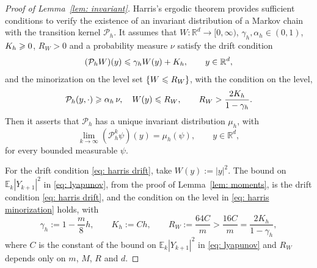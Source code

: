 \begin{proof}[Proof of Lemma~\ref{lem: invariant}]
    Harris's ergodic theorem \citep[Theorem~1.2]{hairer2008yet} provides sufficient conditions to verify the existence of an invariant distribution of a Markov chain with the transition kernel $\mathcal P_h$. It assumes that $W \colon \mathbb R^d \to [0,\infty)$, $\gamma_h, \alpha_h \in (0,1)$, $K_h \geqslant 0$, $R_W > 0$ and a probability measure $\nu$ satisfy the drift condition
    \begin{equation}
        (\mathcal P_h W)(y) \leqslant \gamma_h W(y) + K_h , \qquad y \in \mathbb R^d ,
        \label{eq: harris drift}
    \end{equation}
    and the minorization on the level set $\{W \leqslant R_W\}$, with the condition on the level,
    \begin{equation}
        \mathcal P_h(y, \cdot) \geqslant \alpha_h\, \nu , \quad W(y) \leqslant R_W , \qquad
        R_W > \frac{2K_h}{1-\gamma_h} .
        \label{eq: harris minorization}
    \end{equation}
    Then it asserts that $\mathcal P_h$ has a unique invariant distribution $\mu_h$, with
    \begin{equation}
        \lim_{k \to \infty} (\mathcal P_h^k \psi)(y) = \mu_h(\psi) , \qquad y \in \mathbb R^d ,
        \label{eq: harris}
    \end{equation}
    for every bounded measurable $\psi$.

    For the drift condition \eqref{eq: harris drift}, take $W(y) := |y|^2$. The bound on $\mathbb E_k |Y_{k+1}|^2$ in \eqref{eq: lyapunov}, from the proof of Lemma~\ref{lem: moments}, is the drift condition \eqref{eq: harris drift}, and the condition on the level in \eqref{eq: harris minorization} holds, with
    \begin{equation*}
        \gamma_h := 1 - \frac{m}{8} h , \qquad K_h := C h , \qquad R_W := \frac{64 C}{m} > \frac{16 C}{m} = \frac{2K_h}{1 - \gamma_h} ,
    \end{equation*}
    where $C$ is the constant of the bound on $\mathbb E_k |Y_{k+1}|^2$ in \eqref{eq: lyapunov} and $R_W$ depends only on $m$, $M$, $R$ and $d$.


\end{proof}
